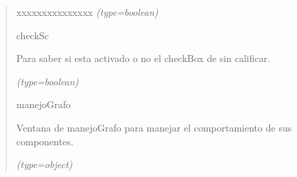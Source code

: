 \begin{boxedminipage}{\funcwidth}
\begin{quote}
\begin{Ventry}{xxxxxxxxxxxxxxx}
            {\it (type=boolean)}

          \item[checkSc]

          Para saber si esta activado o no el checkBox de sin calificar.

            {\it (type=boolean)}

          \item[manejoGrafo]

          Ventana de manejoGrafo para manejar el comportamiento de sus 
          componentes.

            {\it (type=object)}

        \end{Ventry}

      \end{quote}

    \end{boxedminipage}

